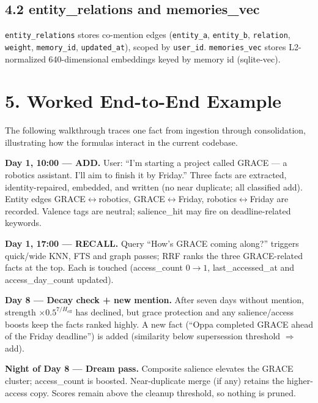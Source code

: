 \documentclass[]{article}
\begin{document}
\hypertarget{entity-relations-and-vectors}{%
\subsection{\texorpdfstring{\textbf{4.2 entity\_relations and
memories\_vec}}{4.2 entity\_relations and memories\_vec}}\label{entity-relations-and-vectors}}

\texttt{entity\_relations} stores co-mention edges
(\texttt{entity\_a}, \texttt{entity\_b}, \texttt{relation}, \texttt{weight},
\texttt{memory\_id}, \texttt{updated\_at}), scoped by \texttt{user\_id}.
\texttt{memories\_vec} stores L2-normalized 640-dimensional embeddings
keyed by memory id (sqlite-vec).

\hypertarget{worked-end-to-end-example}{%
\section{\texorpdfstring{\textbf{5. Worked End-to-End
Example}}{5. Worked End-to-End Example}}\label{worked-end-to-end-example}}

The following walkthrough traces one fact from ingestion through
consolidation, illustrating how the formulas interact in the current
codebase.

\textbf{Day 1, 10:00 --- ADD.} User: ``I'm starting a project called
GRACE --- a robotics assistant. I'll aim to finish it by Friday.'' Three
facts are extracted, identity-repaired, embedded, and written (no near
duplicate; all classified add). Entity edges GRACE\(\leftrightarrow\)robotics,
GRACE\(\leftrightarrow\)Friday, robotics\(\leftrightarrow\)Friday are recorded.
Valence tags are neutral; salience\_hit may fire on deadline-related
keywords.

\textbf{Day 1, 17:00 --- RECALL.} Query ``How's GRACE coming along?''
triggers quick/wide KNN, FTS and graph passes; RRF ranks the three
GRACE-related facts at the top. Each is touched (access\_count \(0\to1\),
last\_accessed\_at and access\_day\_count updated).

\textbf{Day 8 --- Decay check + new mention.} After seven days without
mention, strength \(\times 0.5^{7/H_{\text{eff}}}\) has declined, but grace
protection and any salience/access boosts keep the facts ranked highly.
A new fact (``Oppa completed GRACE ahead of the Friday deadline'') is
added (similarity below supersession threshold \(\Rightarrow\) add).

\textbf{Night of Day 8 --- Dream pass.} Composite salience elevates the
GRACE cluster; access\_count is boosted. Near-duplicate merge (if any)
retains the higher-access copy. Scores remain above the cleanup threshold,
so nothing is pruned.
\end{document}
